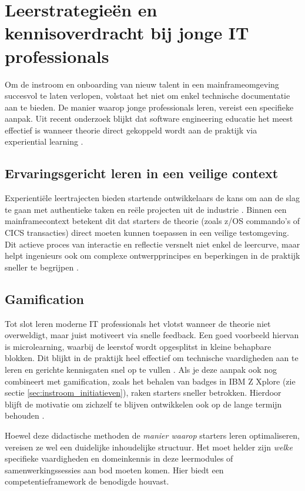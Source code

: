 \section{Leerstrategieën en kennisoverdracht bij jonge IT professionals}%
\label{sec:leerstrategieen-jong-talent}

Om de instroom en onboarding van nieuw talent in een mainframeomgeving succesvol te laten verlopen, volstaat het niet om enkel technische documentatie aan te bieden.
De manier waarop jonge professionals leren, vereist een specifieke aanpak.
Uit recent onderzoek blijkt dat software engineering educatie het meest effectief is wanneer theorie direct gekoppeld wordt aan de praktijk via experiential learning \autocite{holmes2018dimensions}.

\subsection{Ervaringsgericht leren in een veilige context}
Experientiële leertrajecten bieden startende ontwikkelaars de kans om aan de slag te gaan met authentieke taken en reële projecten uit de industrie \autocite{holmes2018dimensions}.
Binnen een mainframecontext betekent dit dat starters de theorie (zoals z/OS commando's of CICS transacties) direct moeten kunnen toepassen in een veilige testomgeving.
Dit actieve proces van interactie en reflectie versnelt niet enkel de leercurve, maar helpt ingenieurs ook om complexe ontwerpprincipes en beperkingen in de praktijk sneller te begrijpen \autocite{sotaquira2024hackathons}.

\subsection{Gamification}
Tot slot leren moderne IT professionals het vlotst wanneer de theorie niet overweldigt, maar juist motiveert via snelle feedback.
Een goed voorbeeld hiervan is microlearning, waarbij de leerstof wordt opgesplitst in kleine behapbare blokken.
Dit blijkt in de praktijk heel effectief om technische vaardigheden aan te leren en gerichte kennisgaten snel op te vullen \autocite{granatella}.
Als je deze aanpak ook nog combineert met gamification, zoals het behalen van badges in IBM Z Xplore (zie sectie \ref{sec:instroom_initiatieven}), raken starters sneller betrokken.
Hierdoor blijft de motivatie om zichzelf te blijven ontwikkelen ook op de lange termijn behouden \autocite{dinardo2024usage}.

Hoewel deze didactische methoden de \textit{manier waarop} starters leren optimaliseren, vereisen ze wel een duidelijke inhoudelijke structuur.
Het moet helder zijn \textit{welke} specifieke vaardigheden en domeinkennis in deze leermodules of samenwerkingssessies aan bod moeten komen.
Hier biedt een competentieframework de benodigde houvast.






